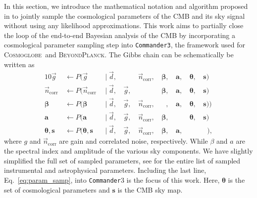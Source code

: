 \documentclass[twocolumn]{../common/aa}
\def\commander{\texttt{Commander}}
\def\commanderthree{\texttt{Commander3}}
\newcommand{\g}[0]{\vec{g}}
\newcommand{\BP}{\textsc{BeyondPlanck}}
\newcommand{\cosmoglobe}{\textsc{Cosmoglobe}}
\newcommand{\data}{\vec d}
\newcommand{\ncorr}{\vec n_\mathrm{corr}}
\begin{document}
In this section, we introduce the mathematical notation and algorithm proposed in \citet{racine:2016} to jointly sample the cosmological parameters of the CMB and its sky signal without using any likelihood approximations. This work aims to partially close the loop of the end-to-end Bayesian analysis of the CMB by incorporating a cosmological parameter sampling step into \commanderthree, the framework used for \cosmoglobe\ and \BP. The Gibbs chain can be schematically be written as  
  \begin{alignat}{10}
    \label{eq:gain_samp_dist}\g &\,\leftarrow          P(\g&\,               \mid \data, &\,\phantom{\g,} &\,\ncorr,&\,\boldsymbol\beta, &\,\boldsymbol a, &\,\boldsymbol \theta, &\, \boldsymbol s)\\
    \label{eq:ncorr_samp_dist} \ncorr &\,\leftarrow    P(\ncorr&\,        \mid \data, &\,\g, &\,\phantom{\ncorr,}  &\,\boldsymbol\beta, &\,\boldsymbol a, &\,\boldsymbol \theta, &\, \boldsymbol s)\\
    \label{eq:beta_samp}\boldsymbol\beta &\,\leftarrow                     P(\boldsymbol\beta &\, \mid \data, &\,\g, &\,\ncorr, &\,\phantom{\boldsymbol\beta}, &\,\boldsymbol a, &\,\boldsymbol \theta, &\, \boldsymbol s))\\
    \boldsymbol a &\,\leftarrow                                   P(\boldsymbol a&\,            \mid \data, &\,\g, &\,\ncorr, &\,\boldsymbol\beta, &\,\phantom{\boldsymbol a,} &\,\boldsymbol \theta, &\, \boldsymbol s)\\
    \boldsymbol\theta, \boldsymbol{s} &\,\leftarrow                             P(\boldsymbol\theta, \boldsymbol{s}&\,         \mid \data, &\,\g, &\,\ncorr, &\,\boldsymbol\beta, &\,\boldsymbol a,&\,\phantom{,}&\,\phantom{\boldsymbol\theta})\label{eq:param_samp},
    \end{alignat}
where $g$ and $\ncorr$ are gain and correlated noise, respectively. While $\beta$ and $a$ are the spectral index and amplitude of the various sky components. We have slightly simplified the full set of sampled parameters, see \cite{watts2023_dr1} for the entire list of sampled instrumental and astrophysical parameters. Including the last line, Eq.~\eqref{eq:param_samp}, into \commander3 is the focus of this work. Here, $\boldsymbol \theta$ is the set of cosmological parameters and $\boldsymbol s$ is the CMB sky map.
\end{document}
